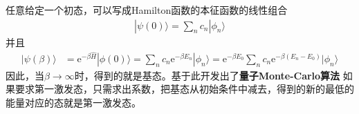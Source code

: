         任意给定一个初态，可以写成Hamilton函数的本征函数的线性组合
        \begin{align*}
            |\psi(0) \rangle = \sum_n c_n |\phi_n\rangle
        \end{align*}
        并且
        \begin{align*}
            |\psi(\beta) \rangle &= \mathrm{e}^{-\beta \hat{H}} |\phi(0) \rangle = \sum_n c_n\mathrm{e}^{-\beta E_n}|\phi_n \rangle = \mathrm{e}^{-\beta E_0} \sum_n c_n \mathrm{e}^{-\beta(E_n-E_0)} |\phi_n \rangle
        \end{align*}
        因此，当$\beta \to \infty$时，得到的就是基态。基于此开发出了\textbf{量子Monte-Carlo算法}
        如果要求第一激发态，只需求出系数，把基态从初始条件中减去，得到的新的最低的能量对应的态就是第一激发态。
        
        